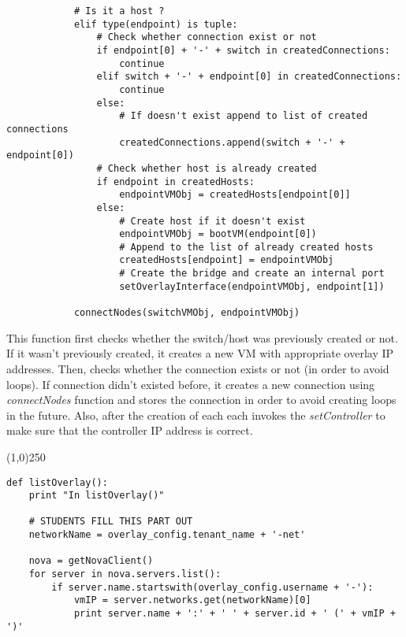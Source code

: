 \documentclass[12pt]{article}
\begin{document}
\begin{verbatim}
            # Is it a host ?
            elif type(endpoint) is tuple:
                # Check whether connection exist or not
                if endpoint[0] + '-' + switch in createdConnections:
                    continue
                elif switch + '-' + endpoint[0] in createdConnections:
                    continue
                else:
                    # If doesn't exist append to list of created connections
                    createdConnections.append(switch + '-' + endpoint[0])
                # Check whether host is already created
                if endpoint in createdHosts:
                    endpointVMObj = createdHosts[endpoint[0]]
                else:
                    # Create host if it doesn't exist
                    endpointVMObj = bootVM(endpoint[0])
                    # Append to the list of already created hosts
                    createdHosts[endpoint] = endpointVMObj
                    # Create the bridge and create an internal port
                    setOverlayInterface(endpointVMObj, endpoint[1])

            connectNodes(switchVMObj, endpointVMObj)
\end{verbatim}

This function first checks whether the switch/host was previously created or not. If it wasn't previously created, it creates a new VM with appropriate overlay IP addresses. Then, checks whether the connection exists or not (in order to avoid loops). If connection didn't existed before, it creates a new connection using \textit{connectNodes} function and stores the connection in order to avoid creating loops in the future. Also, after the creation of each each invokes the \textit{setController} to make sure that the controller IP address is correct.

\begin{center}
	\line(1,0){250}
\end{center}

\begin{verbatim}
def listOverlay():
    print "In listOverlay()"

    # STUDENTS FILL THIS PART OUT
    networkName = overlay_config.tenant_name + '-net'

    nova = getNovaClient()
    for server in nova.servers.list():
        if server.name.startswith(overlay_config.username + '-'):
            vmIP = server.networks.get(networkName)[0]
            print server.name + ':' + ' ' + server.id + ' (' + vmIP + ')'
\end{verbatim}
\end{document}
